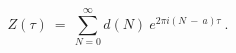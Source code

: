 \begin{equation}\label{9}
Z(\tau ) ~=~ \sum^{\infty}_{N=0} d(N) ~ e^{2 \pi i(N ~-~ a) \tau} ~ .
\end{equation}


